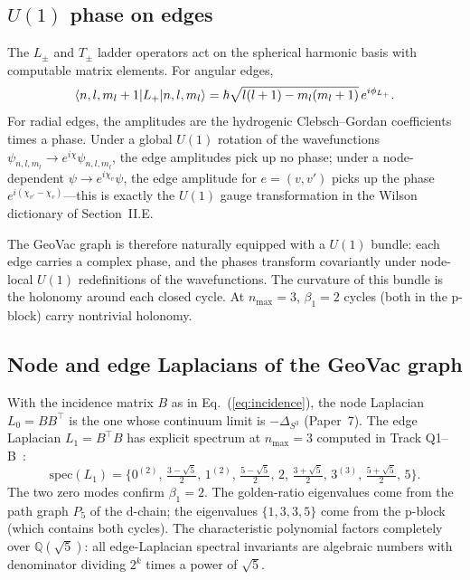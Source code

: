 \documentclass[aps,pra,twocolumn,superscriptaddress,longbibliography]{revtex4-2}
\begin{document}
\subsection{$U(1)$ phase on edges}

The $L_\pm$ and $T_\pm$ ladder operators act on the spherical
harmonic basis with computable matrix elements.  For angular edges,
\begin{equation}
\braket{n, l, m_l + 1 | L_+ | n, l, m_l}
= \hbar \sqrt{l(l+1) - m_l(m_l+1)} \, e^{i\phi_{L_+}}.
\label{eq:Lplus}
\end{equation}
For radial edges, the amplitudes are the hydrogenic Clebsch--Gordan
coefficients times a phase.  Under a global $U(1)$ rotation of the
wavefunctions $\psi_{n,l,m_l} \to e^{i\chi}\psi_{n,l,m_l}$, the edge
amplitudes pick up no phase; under a node-dependent
$\psi \to e^{i\chi_v}\psi$, the edge amplitude for $e = (v, v')$ picks
up the phase $e^{i(\chi_{v'} - \chi_v)}$---this is exactly the
$U(1)$ gauge transformation in the Wilson dictionary of Section~II.E.

The GeoVac graph is therefore naturally equipped with a $U(1)$ bundle:
each edge carries a complex phase, and the phases transform
covariantly under node-local $U(1)$ redefinitions of the wavefunctions.
The curvature of this bundle is the holonomy around each closed
cycle.  At $n_{\max} = 3$, $\beta_1 = 2$ cycles (both in the
p-block) carry nontrivial holonomy.

\subsection{Node and edge Laplacians of the GeoVac graph}

With the incidence matrix $B$ as in Eq.~(\ref{eq:incidence}), the
node Laplacian $L_0 = B B^{\top}$ is the one whose continuum limit
is $-\Delta_{S^3}$ (Paper~7).  The edge Laplacian
$L_1 = B^{\top} B$ has explicit spectrum at $n_{\max} = 3$
computed in Track Q1--B~\cite{Q1B}:
\begin{equation}
\mathrm{spec}(L_1) = \{0^{(2)},\, \tfrac{3-\sqrt{5}}{2},\, 1^{(2)},\,
  \tfrac{5-\sqrt{5}}{2},\, 2,\, \tfrac{3+\sqrt{5}}{2},\, 3^{(3)},\,
  \tfrac{5+\sqrt{5}}{2},\, 5\}.
\label{eq:L1_spectrum}
\end{equation}
The two zero modes confirm $\beta_1 = 2$.  The golden-ratio
eigenvalues come from the path graph $P_5$ of the d-chain; the
eigenvalues $\{1, 3, 3, 5\}$ come from the p-block (which contains
both cycles).  The characteristic polynomial factors completely over
$\mathbb{Q}(\sqrt{5})$: all edge-Laplacian spectral invariants are
algebraic numbers with denominator dividing $2^k$ times a power of
$\sqrt{5}$.
\end{document}

